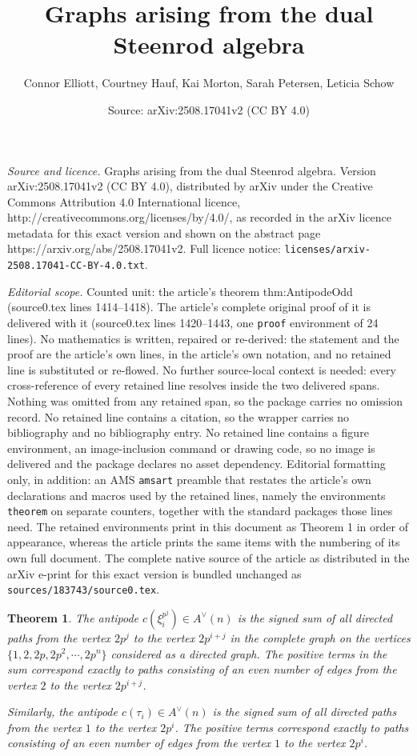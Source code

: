 \documentclass[10pt,a4paper]{amsart}
\title{Graphs arising from the dual Steenrod algebra}
\author{Connor Elliott, Courtney Hauf, Kai Morton, Sarah Petersen, Leticia Schow}
\date{Source: arXiv:2508.17041v2 (CC BY 4.0)}
\newtheorem{theorem}{Theorem}
\begin{document}
\maketitle

\noindent\emph{Source and licence.} Graphs arising from the dual Steenrod algebra. Version arXiv:2508.17041v2 (CC BY 4.0), distributed by arXiv under the Creative Commons Attribution 4.0 International licence, http://creativecommons.org/licenses/by/4.0/, as recorded in the arXiv licence metadata for this exact version and shown on the abstract page https://arxiv.org/abs/2508.17041v2. Full licence notice: \texttt{licenses/arxiv-2508.17041-CC-BY-4.0.txt}.\par\smallskip

\noindent\textit{Editorial scope.} Counted unit: the article's theorem thm:AntipodeOdd (source0.tex lines 1414--1418). The article's complete original proof of it is delivered with it (source0.tex lines 1420--1443, one \texttt{proof} environment of 24 lines). No mathematics is written, repaired or re-derived: the statement and the proof are the article's own lines, in the article's own notation, and no retained line is substituted or re-flowed.  No further source-local context is needed: every cross-reference of every retained line resolves inside the two delivered spans.  Nothing was omitted from any retained span, so the package carries no omission record.  No retained line contains a citation, so the wrapper carries no bibliography and no bibliography entry.  No retained line contains a figure environment, an image-inclusion command or drawing code, so no image is delivered and the package declares no asset dependency.  Editorial formatting only, in addition: an AMS \texttt{amsart} preamble that restates the article's own declarations and macros used by the retained lines, namely the environments \texttt{theorem} on separate counters, together with the standard packages those lines need.  The retained environments print in this document as Theorem 1 in order of appearance, whereas the article prints the same items with the numbering of its own full document.  The complete native source of the article as distributed in the arXiv e-print for this exact version is bundled unchanged as \texttt{sources/183743/source0.tex}.
\begin{theorem} \label{thm:AntipodeOdd} 
    The antipode $c(\xi_i^{p^j}) \in A^\vee(n)$ is the signed sum of all directed paths from the vertex $2 p^j$ to the vertex $2 p^{i + j}$ in the complete graph on the vertices $\{1,2, 2p, 2p^2, \cdots, 2p^n\}$ considered as a directed graph. The positive terms in the sum correspond exactly to paths consisting of an even number of edges from the vertex $2$ to the vertex $2p^{i +j}$.

    Similarly, the antipode $c(\tau_i) \in A^\vee(n)$ is the signed sum of all directed paths from the vertex $1$ to the vertex $2 p^{i}$. The positive terms correspond exactly to paths consisting of an even number of edges from the vertex $1$ to the vertex $2 p^i$. \color{black}
\end{theorem} 
\end{document}
